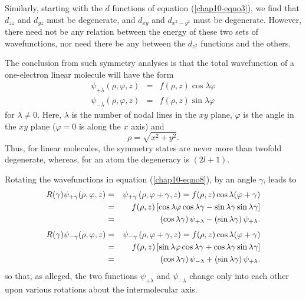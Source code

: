 Similarly, starting with the $d$ functions of equation
(\ref{chap10-eqno3}), we find that $d_{zz}$ and $d_{yz}$ must be
degenerate, and $d_{xy}$ and $d_{x^2-y^2}$ must be degenerate.
However, there need not be any relation between the energy of these
two sets of wavefunctions, nor need there be any between the $d_{z^2}$
functions and the others.

The conclusion from such symmetry analyses is that the total 
wavefunction of a one-electron linear molecule will have the form
\begin{eqnarray}
\psi_{+\lambda} \left( \rho, \varphi , z \right) &=& f ( \rho , z ) 
\cos \lambda \varphi\\
\psi_{- \lambda} ( \rho , \varphi , z ) &=& f ( \rho , z ) \sin 
\lambda \varphi
\label{chap10-eqno8}
\end{eqnarray}
for $\lambda \not= 0$.  Here, $\lambda$  
is the number of nodal lines in the $xy$ plane, $\varphi$ is the angle in the
$xy$ plane ($\varphi = 0$ is along the $x$ axis) and 
\begin{equation}
\rho = \sqrt{x^2 + y^2}.
\end{equation}
Thus, for linear
molecules, the symmetry states are never more than twofold degenerate,
whereas, for an atom the degeneracy is $(2l + 1)$.

Rotating the wavefunctions in equation (\ref{chap10-eqno8}), by an
angle $\gamma$, leads to
\begin{eqnarray}
R( \gamma ) \psi_{+ \gamma} ( \rho , \varphi , z ) &=& \psi_{+ \gamma} 
\left( \rho , \varphi + \gamma , z \right) = f ( \rho , z ) \cos 
\lambda ( \varphi + \gamma )\cr
&=& f ( \rho , z ) \left[ \cos \lambda \varphi \cos \lambda \gamma - 
\sin \lambda \gamma \sin \lambda \gamma \right]\cr
&=& \left( \cos \lambda \gamma \right) \psi_{+ \lambda} - \left( \sin 
\lambda \gamma \right) \psi_{+ \lambda} .
\label{chap10-eqno10}
\end{eqnarray}
\begin{eqnarray}
R( \gamma ) \psi_{- \gamma} ( \rho , \varphi , z ) &=& \psi_{- \gamma} 
\left( \rho , \varphi + \gamma , z \right) = f ( \rho , z ) \cos 
\lambda ( \varphi + \gamma )\cr
&=& f ( \rho , z ) \left[ \sin \lambda \varphi \cos \lambda \gamma + 
\cos \lambda \gamma \sin \lambda \gamma \right]\cr
&=& \left( \cos \lambda \gamma \right) \psi_{- \lambda} + \left( \sin 
\lambda \gamma \right) \psi_{+ \lambda} .
\label{chap10-eqno11}
\end{eqnarray}
so that, as alleged, the two functions $\psi_{+ \lambda}$ and $\psi_{- 
\lambda}$ change only into 
each other upon various rotations about the intermolecular axis.

